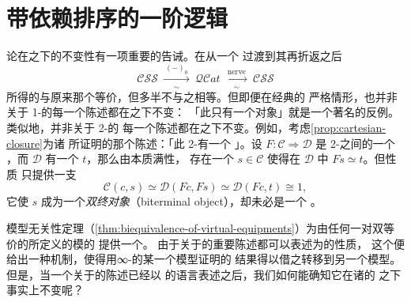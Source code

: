 \providecommand{\Fun}{\operatorname{Fun}}
\providecommand{\QCat}{\mathcal{Q}\mathcal{C}at}
\providecommand{\CSS}{\mathcal{C}\mathcal{S}\mathcal{S}}
\providecommand{\Set}{\mathcal{S}et}
\providecommand{\Cat}{\mathcal{C}at}
\providecommand{\hciso}{\mathbb{I}}  %

\section{带依赖排序的一阶逻辑}\label{sec:first-order-logic-dependent-sorts}

\trInfinityCategory{}论在\trChangeOfModel{}之下的不变性有一项重要的告诫。在从一个%
\trCompleteSegalSpaces{}过渡到其\trUnderlyingQuasiCategory{}再折返之后
\begin{equation*}
\CSS\ \xrightarrow[\ \sim\ ]{\ (-)_{0}\ }\ \QCat\ \xrightarrow[\ \sim\ ]{\ \mathrm{nerve}\ }\ \CSS
\end{equation*}
所得的\trCompleteSegalSpaces{}与原来那个等价，但多半不与之相等。但即便在经典的
严格情形，也并非关于 1-\trCategory{}的每一个陈述都在\trEquivalence{}之下不变：
「此\trCategory{}只有一个对象」就是一个著名的反例。类似地，并非关于 2-\trCategory{}的
每一个陈述都在\trBiequivalence{}之下不变。例如，考虑\cref{prop:cartesian-closure}为诸%
\trHomotopyTwoCategory{}所证明的那个陈述：「此 2-\trCategory{}有一个%
\trTwoTerminalObject」。设 $F\colon\mathcal{C}\Rightarrow\mathcal{D}$ 是 2-\trCategory{}之间的一个%
\trBiequivalence，而 $\mathcal{D}$ 有一个\trTwoTerminalObject{} $t$，那么由本质满性，
存在一个 $s\in\mathcal{C}$ 使得在 $\mathcal{D}$ 中 $Fs\simeq t$。但\trLocalEquivalence{}性质
只提供一支\trEquivalence
\begin{equation*}
\mathcal{C}(c,s)\simeq\mathcal{D}(Fc,Fs)\simeq\mathcal{D}(Fc,t)\cong 1,
\end{equation*}
它使 $s$ 成为一个\emph{双终对象}（biterminal object），却未必是一个%
\trTwoTerminalObject。

模型无关性定理（\cref{thm:biequivalence-of-virtual-equipments}）为由任何一对双等
价的\trInfinityCosmos{}所定义的模的%
\trVirtualEquipment{}提供一个\trBiequivalence。
由于关于\trInfinityCategories{}的重要陈述都可以表述为\trVirtualEquipment{}的性质，
这个\trBiequivalence{}便给出一种机制，使得用∞-\trCategory{}的某一个模型证明的
结果得以借之转移到另一个模型。但是，当一个关于\trInfinityCategories{}的陈述已经以%
\trVirtualEquipment{}的语言表述之后，我们如何能确知它在诸\trVirtualEquipment{}的%
\trBiequivalence{}之下事实上不变呢？

